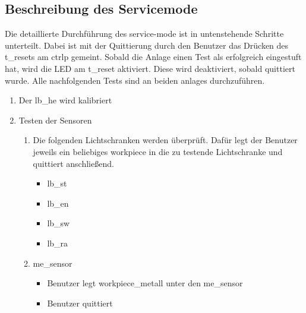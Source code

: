 \subsection{Beschreibung des Servicemode}\label{subsec:beschreibung-des-servicemode}
Die detaillierte Durchführung des \gls{service-mode} ist in untenstehende Schritte unterteilt.
Dabei ist mit der Quittierung durch den Benutzer das Drücken des \gls{t_reset}s am \gls{ctrlp} gemeint.
Sobald die Anlage einen Test als erfolgreich eingestuft hat, wird die LED am \gls{t_reset} aktiviert.
Diese wird deaktiviert, sobald quittiert wurde.
Alle nachfolgenden Tests sind an beiden \glspl{anlage} durchzuführen.
\begin{enumerate}
    \item Der \gls{lb_he} wird kalibriert
    \item Testen der Sensoren
    \begin{enumerate}
        \item Die folgenden Lichtschranken werden überprüft.
        Dafür legt der Benutzer jeweils ein beliebiges \gls{workpiece} in die zu testende Lichtschranke und
        quittiert anschließend.
        \begin{itemize}
            \item \gls{lb_st}
            \item \gls{lb_en}
            \item \gls{lb_sw}
            \item \gls{lb_ra}
        \end{itemize}

        \item \Gls{me_sensor}
        \begin{itemize}
            \item Benutzer legt \gls{workpiece_metall} unter den \gls{me_sensor}
            \item Benutzer quittiert
        \end{itemize}
    \end{enumerate}


\end{enumerate}
